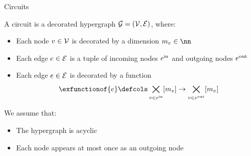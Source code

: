 \documentclass{beamer}
\begin{document}
    \begin{frame}{Circuits}

        \begin{definition}[Circuit]
            A circuit is a decorated hypergraph $\mathcal{G}=(\mathcal{V},\mathcal{E})$, where:
            \begin{itemize}
                \item Each node $v\in\mathcal{V}$ is decorated by a dimension $\catdimof{\node}\in\nn$
                \item Each edge $e\in\mathcal{E}$ is a tuple of incoming nodes $e^{\mathrm{in}}$ and outgoing nodes $e^{\mathrm{out}}$
                \item Each edge $e\in\mathcal{E}$ is decorated by a function
                \begin{align*}
                    \exfunctionof{\edge}
                    \defcols \bigtimes_{\node\in\incomingnodes}[\catdimof{\node}] \rightarrow \bigtimes_{\node\in\outgoingnodes}[\catdimof{\node}]
                \end{align*}
            \end{itemize}

            We assume that:
            \begin{itemize}
                \item The hypergraph is acyclic
                \item Each node appears at most once as an outgoing node
            \end{itemize}


        \end{definition}





    \end{frame}
\end{document}
